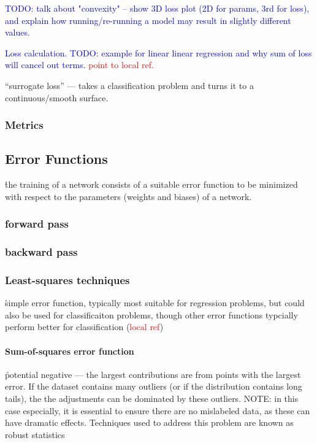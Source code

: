 \textcolor{blue}{TODO: talk about "convexity" -- show 3D loss plot (2D for params, 3rd for loss), and explain how running/re-running a model may result in slightly different values.}

\textcolor{blue}{Loss calculation. TODO: example for linear linear regression and why sum of loss will cancel out terms. \textcolor{red}{point to local ref.}}

\r{``surrogate loss'' --- takes a classification problem and turns it to a continuous/smooth surface.}


\subsubsection{Metrics}

\subsection{Error Functions}


\r{the training of a network consists of a suitable error function to be minimized with respect to the parameters (weights and biases) of a network.}



\subsubsection{forward pass}

\subsubsection{backward pass}

\subsubsection{Least-squares techniques}

\r{simple error function, typically most suitable for regression problems, but could also be used for classificaiton problems, though other error functions typcially perform better for classification (\textcolor{red}{local ref})}

\paragraph{Sum-of-squares error function}

\r{potential negative --- the largest contributions are from points with the largest error. If the dataset contains many outliers (or if the distribution contains long tails), the the adjustments can be dominated by these outliers. NOTE: in this case especially, it is essential to ensure there are no mislabeled data, as these can have dramatic effects. Techniques used to address this problem are known as robust statistics }

